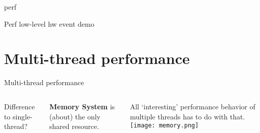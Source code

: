 \documentclass[english,compress]{beamer}
\begin{document}
\begin{frame}{perf}
  \begin{center}
  \Huge Perf low-level hw event demo
  \end{center}
\end{frame}
\section{Multi-thread performance}
\begin{frame}{Multi-thread performance}
  \begin{columns}

      Difference to single-thread?
      \pause

      \bigskip
      \textbf{Memory System} is (about) the only shared resource.

      \bigskip
      All `interesting' performance behavior of multiple threads
      has to do with that.
      \texttt{[image: memory.png]}
  \end{columns}
\end{frame}
\end{document}
